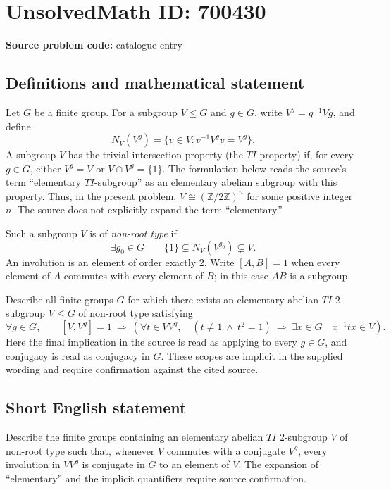 \documentclass[11pt]{article}
\begin{document}
\section*{UnsolvedMath ID: 700430}
\textbf{Source problem code:} catalogue entry
\subsection{Definitions and mathematical statement}
Let \(G\) be a finite group. For a subgroup \(V\leq G\) and \(g\in G\), write \(V^g=g^{-1}Vg\), and define
\[
N_V(V^g)=\{v\in V:v^{-1}V^gv=V^g\}.
\]
A subgroup \(V\) has the trivial-intersection property (the \(TI\) property) if, for every \(g\in G\), either \(V^g=V\) or \(V\cap V^g=\{1\}\). The formulation below reads the source's term ``elementary \(TI\)-subgroup'' as an elementary abelian subgroup with this property. Thus, in the present problem, \(V\cong (\mathbb Z/2\mathbb Z)^n\) for some positive integer \(n\). The source does not explicitly expand the term ``elementary.''

Such a subgroup \(V\) is of \emph{non-root type} if
\[
\exists g_0\in G\qquad \{1\}\subsetneq N_V(V^{g_0})\subsetneq V.
\]
An involution is an element of order exactly \(2\). Write \([A,B]=1\) when every element of \(A\) commutes with every element of \(B\); in this case \(AB\) is a subgroup.

Describe all finite groups \(G\) for which there exists an elementary abelian \(TI\) \(2\)-subgroup \(V\leq G\) of non-root type satisfying
\[
\forall g\in G,\qquad
[V,V^g]=1\ \Longrightarrow\
\left(\forall t\in VV^g,\quad
(t\neq 1\ \land\ t^2=1)\ \Longrightarrow\
\exists x\in G\quad x^{-1}tx\in V\right).
\]
Here the final implication in the source is read as applying to every \(g\in G\), and conjugacy is read as conjugacy in \(G\). These scopes are implicit in the supplied wording and require confirmation against the cited source.
\subsection{Short English statement}
Describe the finite groups containing an elementary abelian \(TI\) \(2\)-subgroup \(V\) of non-root type such that, whenever \(V\) commutes with a conjugate \(V^g\), every involution in \(VV^g\) is conjugate in \(G\) to an element of \(V\). The expansion of ``elementary'' and the implicit quantifiers require source confirmation.
\end{document}
